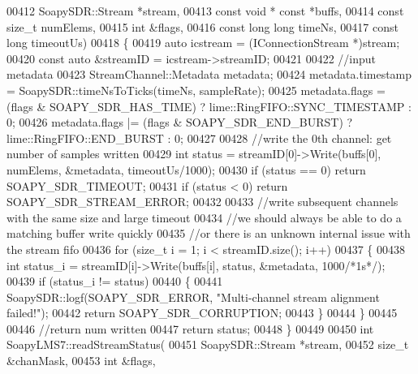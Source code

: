 \begin{DoxyCode}
{00412     SoapySDR::Stream *stream,
00413     \textcolor{keyword}{const} \textcolor{keywordtype}{void} * \textcolor{keyword}{const} *buffs,
00414     \textcolor{keyword}{const} \textcolor{keywordtype}{size\_t} numElems,
00415     \textcolor{keywordtype}{int} &flags,
00416     \textcolor{keyword}{const} \textcolor{keywordtype}{long} \textcolor{keywordtype}{long} timeNs,
00417     \textcolor{keyword}{const} \textcolor{keywordtype}{long} timeoutUs)
00418 \{
00419     \textcolor{keyword}{auto} icstream = (IConnectionStream *)stream;
00420     \textcolor{keyword}{const} \textcolor{keyword}{auto} &streamID = icstream->streamID;
00421 
00422     \textcolor{comment}{//input metadata}
00423     StreamChannel::Metadata metadata;
00424     metadata.timestamp = SoapySDR::timeNsToTicks(timeNs, sampleRate);
00425     metadata.flags = (flags & SOAPY\_SDR\_HAS\_TIME) ? 
      lime::RingFIFO::SYNC_TIMESTAMP : 0;
00426     metadata.flags |= (flags & SOAPY\_SDR\_END\_BURST) ? lime::RingFIFO::END_BURST : 0;
00427 
00428     \textcolor{comment}{//write the 0th channel: get number of samples written}
00429     \textcolor{keywordtype}{int} status = streamID[0]->Write(buffs[0], numElems, &metadata, timeoutUs/1000);
00430     \textcolor{keywordflow}{if} (status == 0) \textcolor{keywordflow}{return} SOAPY\_SDR\_TIMEOUT;
00431     \textcolor{keywordflow}{if} (status < 0) \textcolor{keywordflow}{return} SOAPY\_SDR\_STREAM\_ERROR;
00432 
00433     \textcolor{comment}{//write subsequent channels with the same size and large timeout}
00434     \textcolor{comment}{//we should always be able to do a matching buffer write quickly}
00435     \textcolor{comment}{//or there is an unknown internal issue with the stream fifo}
00436     \textcolor{keywordflow}{for} (\textcolor{keywordtype}{size\_t} i = 1; i < streamID.size(); i++)
00437     \{
00438         \textcolor{keywordtype}{int} status\_i = streamID[i]->Write(buffs[i], status, &metadata, 1000\textcolor{comment}{/*1s*/});
00439         \textcolor{keywordflow}{if} (status\_i != status)
00440         \{
00441             SoapySDR::logf(SOAPY\_SDR\_ERROR, \textcolor{stringliteral}{"Multi-channel stream alignment failed!"});
00442             \textcolor{keywordflow}{return} SOAPY\_SDR\_CORRUPTION;
00443         \}
00444     \}
00445 
00446     \textcolor{comment}{//return num written}
00447     \textcolor{keywordflow}{return} status;
00448 \}
00449 
00450 \textcolor{keywordtype}{int} SoapyLMS7::readStreamStatus(
00451     SoapySDR::Stream *stream,
00452     \textcolor{keywordtype}{size\_t} &chanMask,
00453     \textcolor{keywordtype}{int} &flags,
}
\end{DoxyCode}
